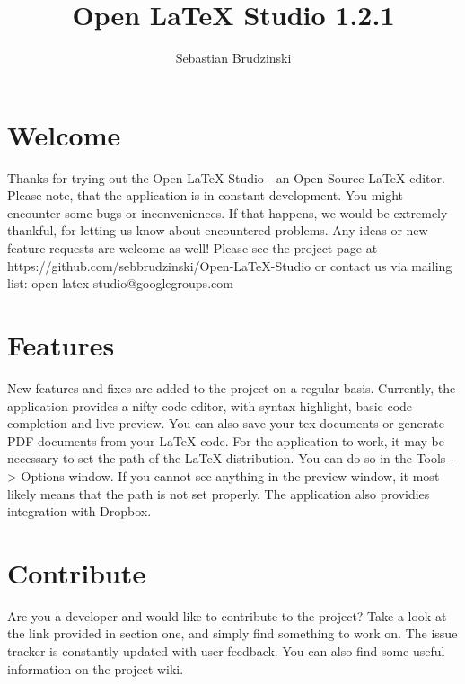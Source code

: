 \documentclass[12pt]{article}
\title{Open \LaTeX{} Studio 1.2.1}
\date{}
\author{Sebastian Brudzinski}
\begin{document}
  \maketitle
  \section{Welcome}
  Thanks for trying out the Open \LaTeX{} Studio - an Open Source \LaTeX{} editor. Please note, that the
  application is in constant development. You might encounter some bugs or inconveniences. If that happens, 
  we would be extremely thankful, for letting us know about encountered problems. Any ideas or new feature
  requests are welcome as well! Please see the project page at 
  https://github.com/sebbrudzinski/Open-LaTeX-Studio
  or contact us via mailing list: open-latex-studio@googlegroups.com

  \section{Features}
  New features and fixes are added to the project on a regular basis. Currently, the application provides
  a nifty code editor, with syntax highlight, basic code completion and live preview. You can also save your tex 
  documents or generate PDF documents from your \LaTeX{} code. For the application to work, it may be necessary to 
  set the path of the LaTeX distribution. You can do so in the Tools -> Options window. If you cannot see anything in the preview window, it most likely means that
  the path is not set properly. The application also providies integration with Dropbox. 

  \section{Contribute}
  Are you a developer and would like to contribute to the project? Take a look at the link provided in section one, 
  and simply find something to work on. The issue tracker is constantly updated with user feedback. You can also
  find some useful information on the project wiki.
\end{document}
